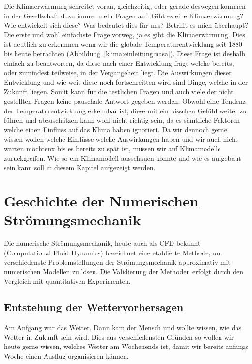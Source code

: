 \begin{refsection}
Die Klimaerwärmung schreitet voran, gleichzeitig, oder gerade deswegen kommen in der Gesellschaft dazu immer mehr Fragen auf. Gibt es eine Klimaerwärmung? Wie entwickelt sich diese? Was bedeutet dies für uns? Betrifft es mich überhaupt? Die erste und wohl einfachste Frage vorweg, ja es gibt die Klimaerwärmung. Dies ist deutlich zu erkennnen wenn wir die globale Temperaturentwicklung seit 1880 bis heute betrachten (Abbildung~\ref{klima:einleitung:nasa}). Diese Frage ist deshalb einfach zu beantworten, da diese nach einer Entwicklung frägt welche bereits, oder zumindest teilweise, in der Vergangeheit liegt. Die Auswirkungen dieser Entwicklung und wie weit diese noch fortschreitten wird sind Dinge, welche in der Zukunft liegen. Somit kann für die restlichen Fragen und auch viele der nicht gestellten Fragen keine pauschale Antwort gegeben werden. Obwohl eine Tendenz der Temperaturentwicklung erkennbar ist, diese mit ein bisschen Gefühl weiter zu führen und abzuschätzen kann wohl nicht richtig sein, da es sämtliche Faktoren welche einen Einfluss auf das Klima haben ignoriert. Da wir dennoch gerne wissen wollen welche Einflüsse welche Auswirkungen haben und wir auch nicht warten möchtenx bis es bereits zu spät ist, müssen wir auf Klimamodelle zurückgreifen. Wie so ein Klimamodell ausschauen könnte und wie es aufgebaut sein kann soll in diesem Kapitel aufgezeigt werden.



\section{Geschichte der Numerischen Strömungsmechanik
\label{section:klima:geschichte}}
Die numerische Strömungsmechanik, heute auch als CFD bekannt (Computational Fluid Dynamics) bezeichnet eine etablierte Methode, um verschiedenste Problemstellungen der Strömungsmechanik approximativ mit numerischen Modellen zu lösen. Die Validierung der Methoden erfolgt durch den Vergleich mit quantitativen Experimenten.



\subsection{Entstehung der Wettervorhersagen
\label{subsection:klima:wetter}}
Am Anfgang war das Wetter. Dann kam der Mensch und wollte wissen, wie das Wetter in Zukunft sein wird. Dies aus verschiedensten Gründen so wollen wir heute gerne wissen, welches Wetter am Wochenende ist, damit wir bereits anfangs Woche einen Ausflug organisieren können.


\end{refsection}
